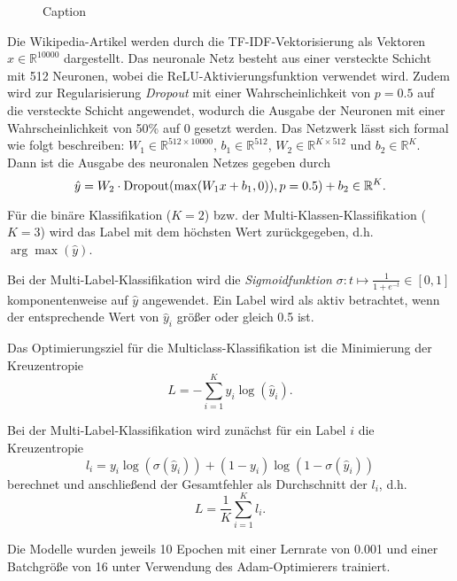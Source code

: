 \begin{figure}[H]
    \centering
    
    \caption{Caption}
\end{figure}
Die Wikipedia-Artikel werden durch die TF-IDF-Vektorisierung als Vektoren $x\in\mathbb{R}^{10000}$ dargestellt. Das neuronale Netz besteht aus einer versteckte Schicht mit 512 Neuronen, wobei die ReLU-Aktivierungsfunktion verwendet wird. Zudem wird zur Regularisierung \textit{Dropout} mit einer Wahrscheinlichkeit von $p=0.5$ auf die versteckte Schicht angewendet, wodurch die Ausgabe der Neuronen mit einer Wahrscheinlichkeit von 50\% auf 0 gesetzt werden. Das Netzwerk lässt sich formal wie folgt beschreiben: $W_1\in\mathbb{R}^{512\times 10000}$, $b_1\in\mathbb{R}^{512}$, $W_2\in\mathbb{R}^{K\times 512}$ und $b_2\in\mathbb{R}^{K}$. Dann ist die Ausgabe des neuronalen Netzes gegeben durch
\begin{equation*}
    \hat{y} = W_2\cdot \operatorname*{Dropout}(\max(W_1x + b_1, 0)), p=0.5) + b_2\in\mathbb{R}^{K}.
\end{equation*}

Für die binäre Klassifikation ($K=2$) bzw. der Multi-Klassen-Klassifikation ($K=3$) wird das Label mit dem höchsten Wert zurückgegeben, d.h. $\arg\max (\hat{y})$.

Bei der Multi-Label-Klassifikation wird die \textit{Sigmoidfunktion} $\sigma\colon t\mapsto \frac{1}{1 + e^{-t}}\in [0, 1]$ komponentenweise auf $\hat{y}$ angewendet. Ein Label wird als aktiv betrachtet, wenn der entsprechende Wert von $\hat{y}_i$ größer oder gleich 0.5 ist.

Das Optimierungsziel für die Multiclass-Klassifikation ist die Minimierung der Kreuzentropie
\begin{equation*}
    L = - \sum_{i=1}^{K}y_i\log(\hat{y}_i).
\end{equation*}

Bei der Multi-Label-Klassifikation wird zunächst für ein Label $i$ die Kreuzentropie
\begin{equation*}
    l_i = y_i\log (\sigma(\hat{y}_i)) + (1 - y_i)\log (1 - \sigma(\hat{y}_i))
\end{equation*}
berechnet und anschließend der Gesamtfehler als Durchschnitt der $l_i$, d.h.
\begin{equation*}
    L = \frac{1}{K}\sum_{i=1}^{K} l_i.
\end{equation*}

Die Modelle wurden jeweils 10 Epochen mit einer Lernrate von 0.001 und einer Batchgröße von 16 unter Verwendung des Adam-Optimierers trainiert.
